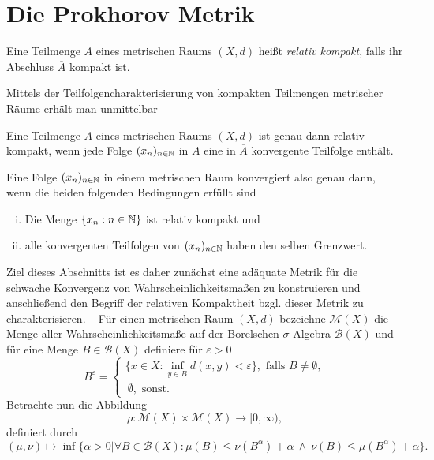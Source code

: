 \section{Die Prokhorov Metrik}

\begin{mydef}
    Eine Teilmenge $A$ eines metrischen Raums $(X,d)$ heißt \textit{relativ kompakt}, falls ihr Abschluss $\overline{A}$ kompakt ist. 
\end{mydef}
Mittels der Teilfolgencharakterisierung von kompakten Teilmengen metrischer Räume erhält man unmittelbar

\begin{proposition}
    Eine Teilmenge $A$ eines metrischen Raums $(X,d)$ ist genau dann relativ kompakt, wenn jede Folge $(x_n)_{n \in \mathbb{N}}$ in $A$ eine in $\overline{A}$ konvergente Teilfolge enthält.
\end{proposition}
Eine Folge $(x_n)_{n \in \mathbb{N}}$ in einem metrischen Raum konvergiert also genau dann, wenn die beiden folgenden Bedingungen erfüllt sind
\begin{enumerate}[(i)]
    \item Die Menge $\{x_n : n \in \mathbb{N} \}$ ist relativ kompakt und
    \item alle konvergenten Teilfolgen von $(x_n)_{n \in \mathbb{N}}$ haben den selben Grenzwert. 
\end{enumerate}

Ziel dieses Abschnitts ist es daher zunächst eine adäquate Metrik für die schwache Konvergenz von Wahrscheinlichkeitsmaßen zu konstruieren 
und anschließend den Begriff der relativen Kompaktheit bzgl. dieser Metrik zu charakterisieren. 
\newline \ \newline
Für einen metrischen Raum $(X,d)$ bezeichne $\mathcal{M}(X)$ die Menge aller Wahrscheinlichkeitsmaße auf der Borelschen $\sigma$-Algebra $\mathcal{B}(X)$ und für eine Menge $B \in \mathcal{B}(X)$ definiere für $\varepsilon > 0$
$$
    B^{\varepsilon} = \begin{cases}
         \{x \in X: \inf_{y \in B}d(x,y) < \varepsilon\}, \text{ falls } B \neq \emptyset, \\\ 
        \emptyset, \text{ sonst.}
    \end{cases}
$$
Betrachte nun die Abbildung 
$$
    \rho: \mathcal{M}(X) \times \mathcal{M}(X) \to [0, \infty),
$$
definiert durch
$$
    (\mu, \nu) \mapsto \inf\{\alpha > 0 | \forall B \in \mathcal{B}(X): \mu(B) \leq \nu(B^{\alpha}) + \alpha \ \land \ \nu(B) \leq \mu(B^{\alpha}) + \alpha \}.
$$

